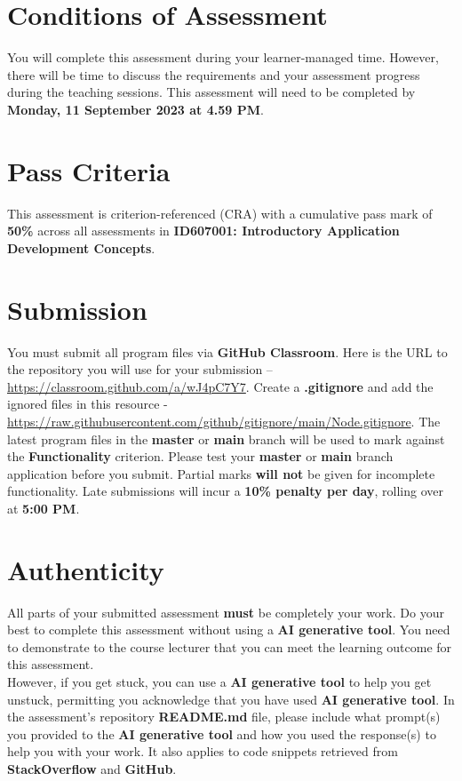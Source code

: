 \documentclass{article}
\begin{document}
\section*{Conditions of Assessment}
You will complete this assessment during your learner-managed time. However, there will be time to discuss the requirements and your assessment progress during the teaching sessions. This assessment will need to be completed by \textbf{Monday, 11 September 2023 at 4.59 PM}.

\section*{Pass Criteria}
This assessment is criterion-referenced (CRA) with a cumulative pass mark of \textbf{50\%} across all assessments in \textbf{ID607001: Introductory Application Development Concepts}.

\section*{Submission}
You must submit all program files via \textbf{GitHub Classroom}. Here is the URL to the repository you will use for your submission – \href{https://classroom.github.com/a/wJ4pC7Y7}{https://classroom.github.com/a/wJ4pC7Y7}. Create a \textbf{.gitignore} and add the ignored files in this resource - \href{https://raw.githubusercontent.com/github/gitignore/main/Node.gitignore}{https://raw.githubusercontent.com/github/gitignore/main/Node.gitignore}. The latest program files in the \textbf{master} or \textbf{main} branch will be used to mark against the \textbf{Functionality} criterion. Please test your \textbf{master} or \textbf{main} branch application before you submit. Partial marks \textbf{will not} be given for incomplete functionality. Late submissions will incur a \textbf{10\% penalty per day}, rolling over at \textbf{5:00 PM}.

\section*{Authenticity}
All parts of your submitted assessment \textbf{must} be completely your work. Do your best to complete this assessment without using a \textbf{AI generative tool}. You need to demonstrate to the course lecturer that you can meet the learning outcome for this assessment. \\
 
 However, if you get stuck, you can use a \textbf{AI generative tool} to help you get unstuck, permitting you acknowledge that you have used \textbf{AI generative tool}. In the assessment's repository \textbf{README.md} file, please include what prompt(s) you provided to the \textbf{AI generative tool} and how you used the response(s) to help you with your work. It also applies to code snippets retrieved from \textbf{StackOverflow} and \textbf{GitHub}. \\
 
\end{document}
